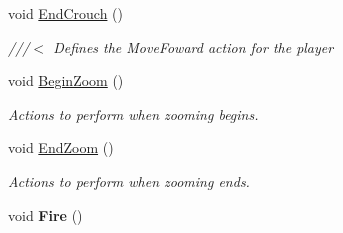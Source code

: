 \begin{DoxyCompactItemize}
void \mbox{\hyperlink{class_a_main_character_a633a5955e941f4ff343709eed9141154}{End\+Crouch}} ()
\begin{DoxyCompactList}\small\item\em ///$<$ Defines the Move\+Foward action for the player \end{DoxyCompactList}\item 
\mbox{\label{class_a_main_character_a4f7eea1e58e20b96564f3408f49737b6}} 
void \mbox{\hyperlink{class_a_main_character_a4f7eea1e58e20b96564f3408f49737b6}{Begin\+Zoom}} ()
\begin{DoxyCompactList}\small\item\em Actions to perform when zooming begins. \end{DoxyCompactList}\item 
\mbox{\label{class_a_main_character_ab226b5c0e4c8fa348e61f0da84680d3e}} 
void \mbox{\hyperlink{class_a_main_character_ab226b5c0e4c8fa348e61f0da84680d3e}{End\+Zoom}} ()
\begin{DoxyCompactList}\small\item\em Actions to perform when zooming ends. \end{DoxyCompactList}\item 
\mbox{\label{class_a_main_character_a741be0918633d2d40692e97dfba67d69}} 
void {\bfseries Fire} ()
\end{DoxyCompactItemize}
